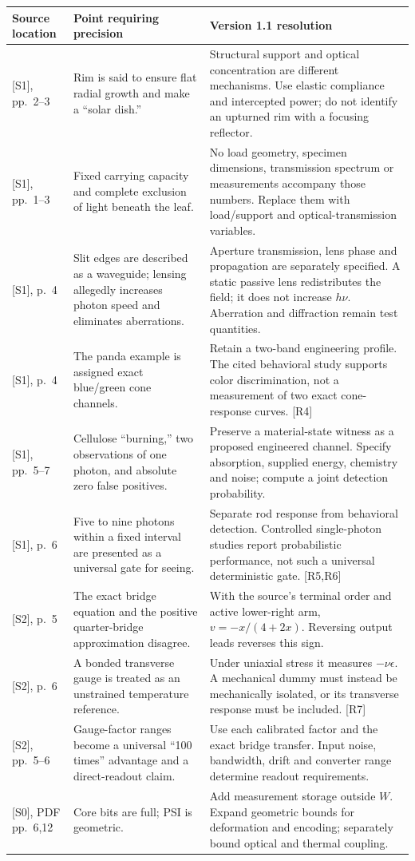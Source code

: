 \documentclass[10pt,a4paper]{article}
\numberwithin{equation}{section}
\begin{document}
\small
\begin{longtable}{@{}P{34mm}P{54mm}P{66mm}@{}}
\toprule
\textbf{Source location} & \textbf{Point requiring precision} & \textbf{Version 1.1 resolution}\\
\midrule
\endhead
{}[S1], pp.~2--3 & Rim is said to ensure flat radial growth and make a ``solar dish.'' & Structural support and optical concentration are different mechanisms. Use elastic compliance and intercepted power; do not identify an upturned rim with a focusing reflector.\\
{}[S1], pp.~1--3 & Fixed carrying capacity and complete exclusion of light beneath the leaf. & No load geometry, specimen dimensions, transmission spectrum or measurements accompany those numbers. Replace them with load/support and optical-transmission variables.\\
{}[S1], p.~4 & Slit edges are described as a waveguide; lensing allegedly increases photon speed and eliminates aberrations. & Aperture transmission, lens phase and propagation are separately specified. A static passive lens redistributes the field; it does not increase $h\nu$. Aberration and diffraction remain test quantities.\\
{}[S1], p.~4 & The panda example is assigned exact blue/green cone channels. & Retain a two-band engineering profile. The cited behavioral study supports color discrimination, not a measurement of two exact cone-response curves. [R4]\\
{}[S1], pp.~5--7 & Cellulose ``burning,'' two observations of one photon, and absolute zero false positives. & Preserve a material-state witness as a proposed engineered channel. Specify absorption, supplied energy, chemistry and noise; compute a joint detection probability.\\
{}[S1], p.~6 & Five to nine photons within a fixed interval are presented as a universal gate for seeing. & Separate rod response from behavioral detection. Controlled single-photon studies report probabilistic performance, not such a universal deterministic gate. [R5,R6]\\
{}[S2], p.~5 & The exact bridge equation and the positive quarter-bridge approximation disagree. & With the source's terminal order and active lower-right arm, $v=-x/(4+2x)$. Reversing output leads reverses this sign.\\
{}[S2], p.~6 & A bonded transverse gauge is treated as an unstrained temperature reference. & Under uniaxial stress it measures $-\nu\epsilon$. A mechanical dummy must instead be mechanically isolated, or its transverse response must be included. [R7]\\
{}[S2], pp.~5--6 & Gauge-factor ranges become a universal ``100 times'' advantage and a direct-readout claim. & Use each calibrated factor and the exact bridge transfer. Input noise, bandwidth, drift and converter range determine readout requirements.\\
{}[S0], PDF pp.~6,12 & Core bits are full; PSI is geometric. & Add measurement storage outside $W$. Expand geometric bounds for deformation and encoding; separately bound optical and thermal coupling.\\
\bottomrule
\end{longtable}
\end{document}
